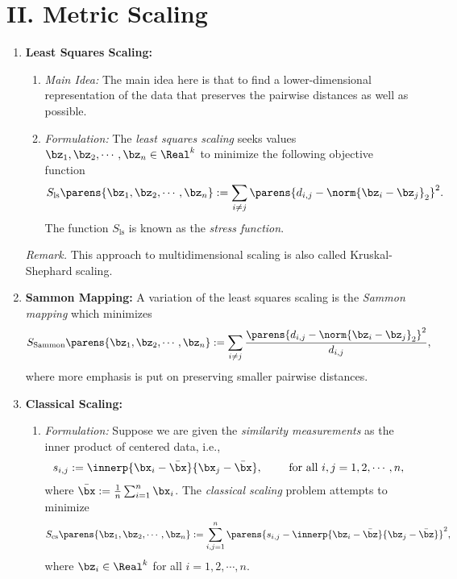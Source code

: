\documentclass[12pt]{article}
\begin{document}
\section*{II. Metric Scaling}

\begin{enumerate}[label=\textbf{\arabic*.}]

	\item \textbf{Least Squares Scaling:} 
	\begin{enumerate}
		\item \textit{Main Idea:} The main idea here is that to find a lower-dimensional representation of the data that preserves the pairwise distances as well as possible. 
		
		\item \textit{Formulation:} The \emph{least squares scaling} seeks values $\bz_1, \bz_2, \cdots, \bz_n \in \Real^k$ to minimize the following objective function 
		\begin{align}
			S_{\mathrm{ls}} \parens{\bz_1, \bz_2, \cdots, \bz_n} := \sum_{i \neq j} \parens{d_{i,j} - \norm{\bz_i - \bz_j}_2}^2. 
		\end{align}
		The function $S_{\mathrm{ls}}$ is known as the \emph{stress function}. 
	\end{enumerate}
	
	\textit{Remark.} This approach to multidimensional scaling is also called Kruskal-Shephard scaling. 
	
	\item \textbf{Sammon Mapping:} A variation of the least squares scaling is the \emph{Sammon mapping} which minimizes 
	\begin{align}
		S_{\mathrm{Sammon}} \parens{\bz_1, \bz_2, \cdots, \bz_n} := \sum_{i \neq j} \frac{\parens{d_{i,j} - \norm{\bz_i - \bz_j}_2}^2}{d_{i,j}}, 
	\end{align}
	where more emphasis is put on preserving smaller pairwise distances. 
	
	\item \textbf{Classical Scaling:} 
	\begin{enumerate}
		\item \textit{Formulation:} Suppose we are given the \emph{similarity measurements} as the inner product of centered data, i.e., 
		\begin{align*}
			s_{i,j} := \innerp{\bx_i - \bar{\bx}}{\bx_j - \bar{\bx}}, \qquad \text{ for all } i, j = 1, 2, \cdots, n, 
		\end{align*}
		where $\bar{\bx} := \frac{1}{n} \sum_{i=1}^n \bx_i$. The \emph{classical scaling} problem attempts to minimize 
		\begin{align}\label{eq-classical-scaling}
			S_{\mathrm{cs}} \parens{\bz_1, \bz_2, \cdots, \bz_n} := \sum_{i,j=1}^n \parens{s_{i,j} - \innerp{\bz_i - \bar{\bz}}{\bz_j - \bar{\bz}}}^2, 
		\end{align}
		where $\bz_i \in \Real^k$ for all $i = 1, 2, \cdots, n$. 
		

\end{enumerate}
\end{enumerate}
\end{document}

